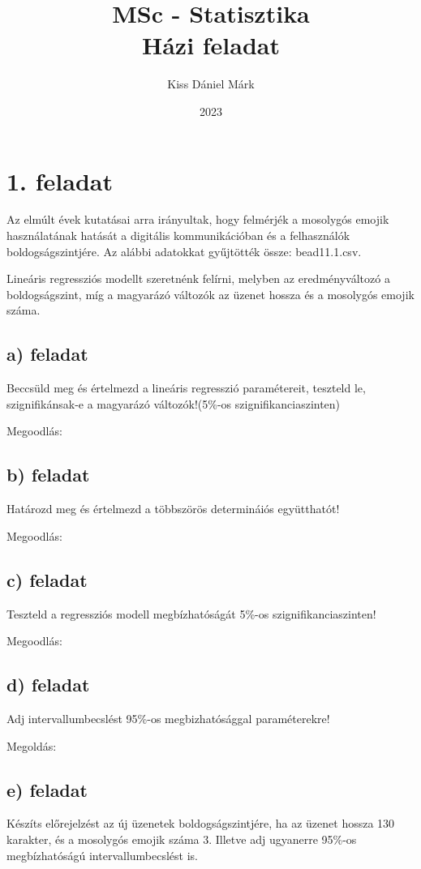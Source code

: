 \documentclass[11pt,a4paper,oneside]{report}
\title{\Huge{MSc - Statisztika}\\Házi feladat}
\author{\huge{Kiss Dániel Márk}}
\date{2023}
\begin{document}
\maketitle
\newpage
\tableofcontents
\pagebreak

\chapter{1. feladat}

Az elmúlt évek kutatásai arra irányultak, hogy felmérjék a mosolygós emojik használatának hatását a digitális kommunikációban
és a felhasználók boldogságszintjére. Az alábbi adatokkat gyűjtötték össze: bead11.1.csv.

Lineáris regressziós modellt szeretnénk felírni, melyben az eredményváltozó a boldogságszint, míg a magyarázó változók az üzenet hossza és
a mosolygós emojik száma.
\section{a) feladat}
Beccsüld meg és értelmezd a lineáris regresszió paramétereit, teszteld le, szignifikánsak-e a magyarázó változók!(5\%-os szignifikanciaszinten)

Megoodlás:


\section{b) feladat}
Határozd meg és értelmezd a többszörös determináiós együtthatót!

Megoodlás:

\section{c) feladat}
Teszteld a regressziós modell megbízhatóságát 5\%-os szignifikanciaszinten!

Megoodlás:

\section{d) feladat}
Adj intervallumbecslést 95\%-os megbizhatósággal paraméterekre!

Megoldás:

\section{e) feladat}
Készíts előrejelzést az új üzenetek boldogságszintjére, ha az üzenet hossza 130 karakter,  és a mosolygós emojik száma 3. Illetve adj ugyanerre 95\%-os megbízhatóságú intervallumbecslést is.
\end{document}
